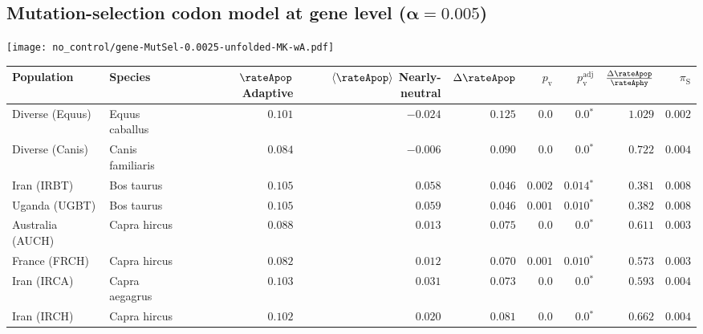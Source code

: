 \subsection{Mutation-selection codon model at gene level ($\bm{\alpha=0.005}$)}
\begin{center}
    \texttt{[image: no\_control/gene-MutSel-0.0025-unfolded-MK-wA.pdf]}
    \begin{adjustbox}{width = 1\textwidth}
        \begin{tabular}{|l|l|r|r|r|r|r|r|r|}
            \toprule
            Population & Species & \specialcell{$\rateApop$ \\ Adaptive}                & \specialcell{$\left< \rateApop \right>$ \\ Nearly-neutral}                & $\Delta \rateApop $    & $p_{\mathrm{v}}$ & $p_{\mathrm{v}}^{\mathrm{adj}}$ & $\frac{\Delta\rateApop}{\rateAphy}$ & $\pi_{\textrm{S}}$    \\
            \midrule
            Diverse (Equus)                    & Equus caballus          & $ 0.101$ & $-0.024$ & $ 0.125$ & $0.0$ & $\bm{0.0{^*}}$ & $ 1.029$ & $ 0.002$ \\
            Diverse (Canis)                  & Canis familiaris          & $ 0.084$ & $-0.006$ & $ 0.090$ & $0.0$ & $\bm{0.0{^*}}$ & $ 0.722$ & $ 0.004$ \\
            Iran (IRBT)               & Bos taurus        & $ 0.105$ & $ 0.058$ & $ 0.046$ & $ 0.002$    & $\bm{ 0.014{^*}}$    & $ 0.381$ & $ 0.008$ \\
            Uganda (UGBT)                  & Bos taurus        & $ 0.105$ & $ 0.059$ & $ 0.046$ & $ 0.001$ & $\bm{ 0.010{^*}}$ & $ 0.382$ & $ 0.008$ \\
            Australia (AUCH)                    & Capra hircus      & $ 0.088$ & $ 0.013$ & $ 0.075$ & $0.0$    & $\bm{0.0{^*}}$    & $ 0.611$ & $ 0.003$ \\
            France (FRCH)                    & Capra hircus        & $ 0.082$ & $ 0.012$ & $ 0.070$ & $ 0.001$    & $\bm{ 0.010{^*}}$    & $ 0.573$ & $ 0.003$ \\
            Iran (IRCA)                   & Capra aegagrus        & $ 0.103$ & $ 0.031$ & $ 0.073$ & $0.0$    & $\bm{0.0{^*}}$    & $ 0.593$ & $ 0.004$ \\
            Iran (IRCH)                 & Capra hircus        & $ 0.102$ & $ 0.020$ & $ 0.081$ & $0.0$    & $\bm{0.0{^*}}$    & $ 0.662$ & $ 0.004$ \\

\end{tabular}
\end{adjustbox}
\end{center}
